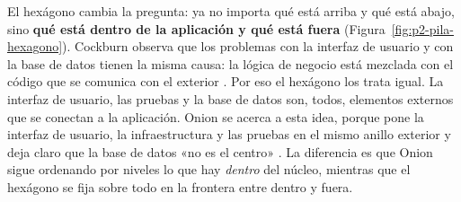 El hexágono cambia la pregunta: ya no importa qué está arriba y qué está abajo, sino \textbf{qué está dentro de la aplicación y qué está fuera} (Figura~\ref{fig:p2-pila-hexagono}). Cockburn observa que los problemas con la interfaz de usuario y con la base de datos tienen la misma causa: la lógica de negocio está mezclada con el código que se comunica con el exterior \citep[«Motivation»; «Nature of the Solution»]{cockburn2005}. Por eso el hexágono los trata igual. La interfaz de usuario, las pruebas y la base de datos son, todos, elementos externos que se conectan a la aplicación. Onion se acerca a esta idea, porque pone la interfaz de usuario, la infraestructura y las pruebas en el mismo anillo exterior y deja claro que la base de datos «no es el centro» \citep{palermo2008}. La diferencia es que Onion sigue ordenando por niveles lo que hay \emph{dentro} del núcleo, mientras que el hexágono se fija sobre todo en la frontera entre dentro y fuera.

